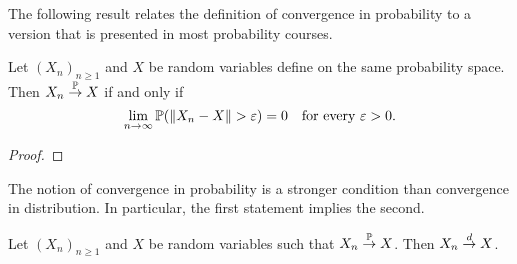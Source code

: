 The following result relates the definition of convergence in probability to a version that is presented in most probability courses.

\begin{lemma}\label{lem:convergence_probability_classical}
Let $(X_n)_{n \ge 1}$ and $X$ be random variables define on the same probability space. Then $X_n \stackrel{\mathbb P}{\rightarrow} X$ if and only if
\[
	\lim_{n \to \infty} \mathbb P(\|X_n - X\| > \varepsilon) = 0 \quad \text{for every } \varepsilon > 0.
\]
\end{lemma}

\begin{proof}

\end{proof}


The notion of convergence in probability is a stronger condition than convergence in distribution. In particular, the first statement implies the second. 

\begin{lemma}
Let $(X_n)_{n \ge 1}$ and $X$ be random variables such that $X_n \stackrel{\mathbb P}{\rightarrow} X$. Then $X_n \stackrel{d}{\rightarrow} X$.
\end{lemma}


